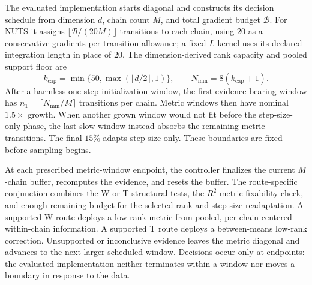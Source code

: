 \documentclass[11pt]{article}
\theoremstyle{plain}
\theoremstyle{definition}
\theoremstyle{remark}
\begin{document}
The evaluated implementation starts diagonal and constructs its decision
schedule from dimension $d$, chain count $M$, and total gradient budget
$\mathcal B$. For NUTS it assigns
$\lfloor\mathcal B/(20M)\rfloor$ transitions to each chain, using $20$ as a
conservative gradients-per-transition allowance; a fixed-$L$ kernel uses its
declared integration length in place of $20$. The dimension-derived rank
capacity and pooled support floor are
\[
 k_{\mathrm{cap}}=\min\{50,\max(\lfloor d/2\rfloor,1)\},
 \qquad N_{\min}=8(k_{\mathrm{cap}}+1).
\]
After a harmless one-step initialization window, the first evidence-bearing
window has
$n_1=\lceil N_{\min}/M\rceil$ transitions per chain. Metric windows then have
nominal $1.5\times$ growth. When another grown window would not fit before the
step-size-only phase, the last slow window instead absorbs the remaining metric
transitions. The final $15\%$ adapts step size only. These boundaries are fixed
before sampling begins.

At each prescribed metric-window endpoint, the controller finalizes the
current $M$-chain buffer, recomputes the evidence, and resets the buffer. The
route-specific conjunction combines the W or T structural tests, the
$R^2$ metric-fixability check, and enough remaining budget for the selected
rank and step-size readaptation. A supported W route deploys a low-rank metric
from pooled, per-chain-centered within-chain information. A supported T route
deploys a between-means low-rank correction. Unsupported or inconclusive
evidence leaves the metric diagonal and advances to the next larger scheduled
window. Decisions occur only at endpoints: the evaluated implementation
neither terminates within a window nor moves a boundary in response to the
data.
\end{document}
